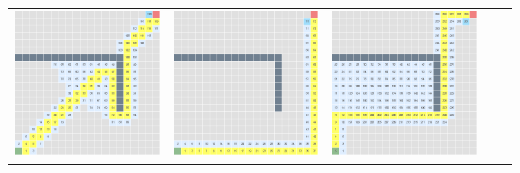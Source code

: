 \documentclass{article}
\begin{document}
\begin{center}
\begin{tabular}{c c c c c}
\includegraphics[scale=0.15]{images/scr33.png} &
\includegraphics[scale=0.15]{images/scr34.png} &
\includegraphics[scale=0.15]{images/scr35.png} \\

\end{tabular}
\end{center}
\end{document}
